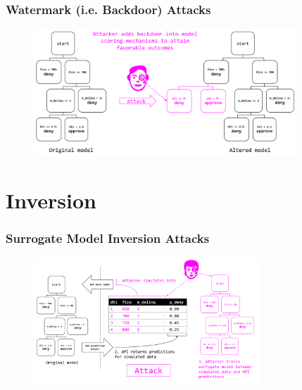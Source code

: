\documentclass[11pt,
               aspectratio=169,
               hyperref={colorlinks}
               ]{beamer}
\begin{document}
		\begin{frame}
		
			\frametitle{Watermark (i.e. Backdoor) Attacks}		
			
			\begin{figure}[htb]
				\begin{center}
					\includegraphics[height=135pt]{img/watermark.PNG}
				\end{center}
			\end{figure}	

		
		\end{frame}

	\section{Inversion}
	
		\begin{frame}
		
			\frametitle{Surrogate Model Inversion Attacks}		
			
			\begin{figure}[htb]
				\begin{center}
					\includegraphics[height=135pt]{img/inversion.PNG}
				\end{center}
			\end{figure}	

		
		\end{frame}
\end{document}
